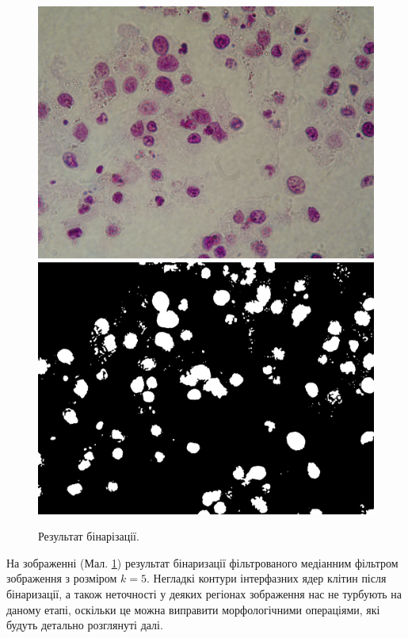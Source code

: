 \begin{figure}[t!]
	\centering
	\includegraphics[width=0.97\linewidth]{Figures/Chapter2/2a.png}
	\endminipage\hfill
	\centering	
	\includegraphics[width=0.97\linewidth]{Figures/Chapter2/2b.png}
	\endminipage\hfill	
	
	\caption{Результат бінарізації.}
	\label{fig:binarized_cells}
\end{figure}

\par
На зображенні (Мал. \ref{fig:binarized_cells}) результат бінаризації фільтрованого медіанним фільтром зображення з розміром \(k = 5\). Негладкі контури інтерфазних ядер клітин після бінаризації, а також неточності у деяких регіонах зображення нас не турбують на даному етапі, оскільки це можна виправити морфологічними операціями, які будуть детально розглянуті далі.


